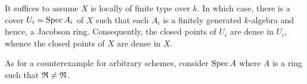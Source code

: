 \begin{exercise} %
    
\end{exercise}

\begin{exercise}\hfill %
\end{exercise}

\begin{exercise}\label{exer:3.14} %
    It suffices to assume $X$ is locally of finite type over $k$. In which case, there is a cover $U_i = \operatorname{Spec} A_i$ of $X$ such that each $A_i$ is a finitely generated $k$-algebra and hence, a Jacobson ring. Consequently, the closed points of $U_i$ are dense in $U_i$, whence the closed points of $X$ are dense in $X$.

    As for a counterexample for arbitrary schemes, consider $\operatorname{Spec} A$ where $A$ is a ring such that $\mathfrak{R}\ne\mathfrak{N}$.
\end{exercise}

\